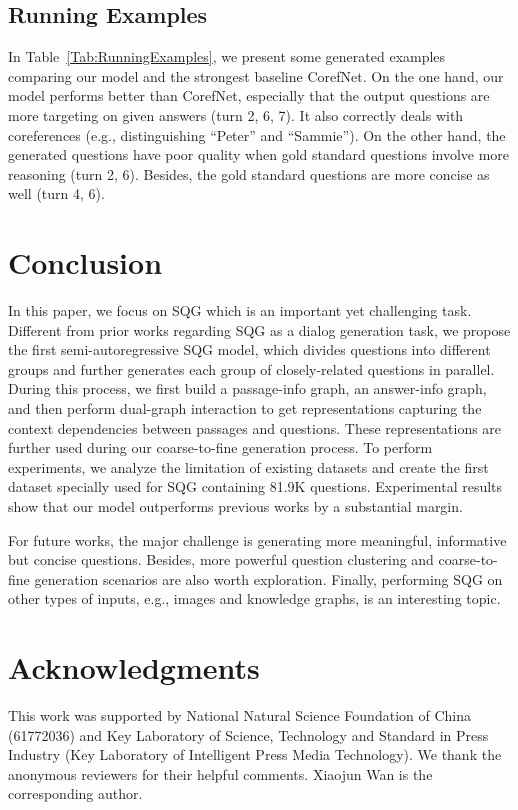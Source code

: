 \documentclass[11pt,a4paper]{article}
\begin{document}
\subsection{Running Examples}
In Table~\ref{Tab:RunningExamples}, we present some generated examples comparing our model and the strongest baseline CorefNet. On the one hand, our model performs better than CorefNet, especially that the output questions are more targeting on given answers (turn 2, 6, 7). It also correctly deals with coreferences (e.g., distinguishing ``Peter'' and ``Sammie''). On the other hand, the generated questions have poor quality when gold standard questions involve more reasoning (turn 2, 6). Besides, the gold standard questions are more concise as well (turn 4, 6).

\section{Conclusion}
In this paper, we focus on SQG which is an important yet challenging task. Different from prior works regarding SQG as a dialog generation task, we propose the first semi-autoregressive SQG model, which divides questions into different groups and further generates each group of closely-related questions in parallel. During this process, we first build a passage-info graph, an answer-info graph, and then perform dual-graph interaction to get representations capturing the context dependencies between passages and questions. These representations are further used during our coarse-to-fine generation process. To perform experiments, we analyze the limitation of existing datasets and create the first dataset specially used for SQG containing 81.9K questions. Experimental results show that our model outperforms previous works by a substantial margin.

For future works, the major challenge is generating more meaningful, informative but concise questions. Besides, more powerful question clustering and coarse-to-fine generation scenarios are also worth exploration. Finally, performing SQG on other types of inputs, e.g., images and knowledge graphs, is an interesting topic.

\section*{Acknowledgments}
This work was supported by National Natural Science Foundation of China (61772036) and Key Laboratory of Science, Technology and Standard in Press Industry (Key Laboratory of Intelligent Press Media Technology). We thank the anonymous reviewers for their helpful comments. Xiaojun Wan is the corresponding author.
\end{document}
